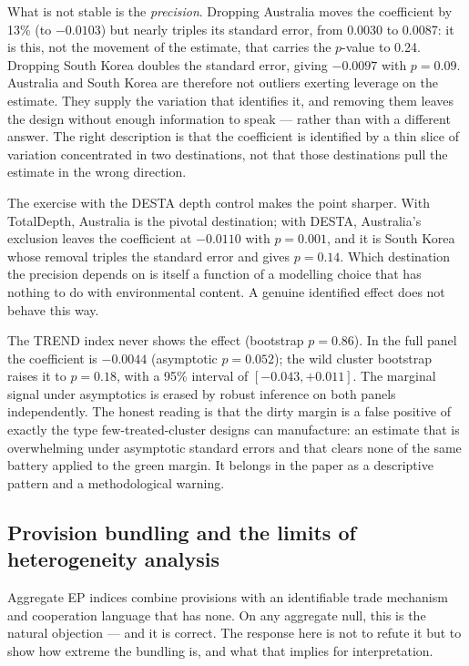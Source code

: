 \documentclass[12pt]{article}
\begin{document}
What is not stable is the \emph{precision}. Dropping Australia moves the coefficient by
13\% (to $-0.0103$) but nearly triples its standard error, from 0.0030 to 0.0087: it is
this, not the movement of the estimate, that carries the $p$-value to 0.24. Dropping
South Korea doubles the standard error, giving $-0.0097$ with $p = 0.09$. Australia and
South Korea are therefore not outliers exerting leverage on the estimate. They supply the
variation that identifies it, and removing them leaves the design without enough
information to speak --- rather than with a different answer. The right description is
that the coefficient is identified by a thin slice of variation concentrated in two
destinations, not that those destinations pull the estimate in the wrong direction.

The exercise with the DESTA depth control makes the point sharper. With TotalDepth,
Australia is the pivotal destination; with DESTA, Australia's exclusion leaves the
coefficient at $-0.0110$ with $p = 0.001$, and it is South Korea whose removal triples
the standard error and gives $p = 0.14$. Which destination the precision depends on is
itself a function of a modelling choice that has nothing to do with environmental
content. A genuine identified effect does not behave this way.

The TREND index never shows the effect (bootstrap $p = 0.86$). In the full panel the
coefficient is $-0.0044$ (asymptotic $p = 0.052$); the wild cluster bootstrap raises it
to $p = 0.18$, with a 95\% interval of $[-0.043, +0.011]$. The marginal signal under
asymptotics is erased by robust inference on both panels independently. The honest
reading is that the dirty margin is a false positive of exactly the type few-treated-cluster
designs can manufacture: an estimate that is overwhelming under asymptotic standard errors
and that clears none of the same battery applied to the green margin. It belongs in the
paper as a descriptive pattern and a methodological warning.

\subsection{Provision bundling and the limits of heterogeneity analysis}\label{sec:bundling}

Aggregate EP indices combine provisions with an identifiable trade mechanism and
cooperation language that has none. On any aggregate null, this is the natural objection
--- and it is correct. The response here is not to refute it but to show how extreme the
bundling is, and what that implies for interpretation.
\end{document}
